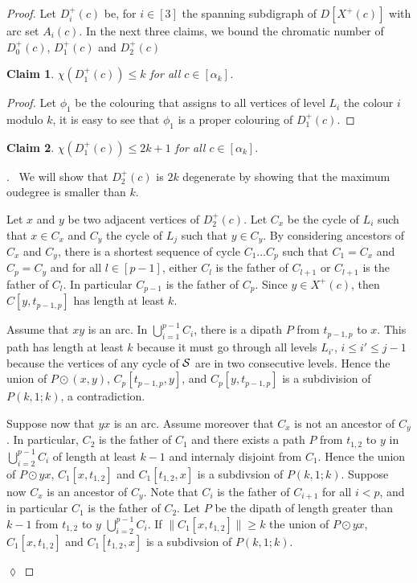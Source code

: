 \documentclass[utf8,10pt]{article}
\theoremstyle{plain}
\newtheorem{claim}{Claim}[theorem]
\theoremstyle{definition}
\theoremstyle{remark}
\newenvironment{subproof}{\par\noindent {\it Subproof}.\ }{\hfill$\lozenge$\par\vspace{11pt}}
\begin{document}
\begin{proof}
Let $D^+_i(c)$ be, for $i \in [3]$ the spanning subdigraph of $D[X^+(c)]$ with arc set $A_i(c)$.
In the next three claims, we bound the chromatic number of $D^+_0(c)$, $D^+_1(c)$ and  $D^+_2(c)$

\begin{claim}\label{claim:D1}
$\chi(D^+_1(c))\leq k$ for all $c\in [\alpha_k]$.
\end{claim}

\begin{proof}
Let $\phi_1$ be the colouring that assigns to all vertices of level $L_i$ the colour $i$ modulo $k$, it 
is easy to see that $\phi_1$ is a proper colouring of $D^+_1(c)$.
\end{proof}

\begin{claim}\label{claim:D2}
$\chi(D^+_1(c))\leq 2k +1 $ for all $c\in [\alpha_k]$.
\end{claim}

\begin{subproof}
We will show that $D^+_2(c)$ is $2k$ degenerate by showing that the maximum oudegree is smaller than $k$.  

Let $x$ and $y$ be two adjacent vertices of $D^+_2(c)$.
Let $C_x$ be the cycle of $L_i$ such that $x \in C_x$ and $C_y$ the cycle of $L_j$ such that $y \in C_y$.
By considering ancestors of $C_x$ and $C_y$, there is a shortest sequence of cycle $C_1 \dots C_p$ such that $C_1 = C_x$ and $C_p = C_y$ and for all $l\in [p-1]$, either $C_l$ is the father of $C_{l+1}$ or $C_{l+1}$ is the father of $C_l$.
In particular $C_{p-1}$ is the father of $C_p$. Since $y\in X^+(c)$, then $C[y,t_{p-1,p}]$ has length at least $k$.

Assume that $xy$ is an arc. In $\bigcup_{i=1}^{p-1} C_i$, there is a dipath $P$ from $t_{p-1,p}$ to $x$. This path has length at least $k$ because
it must go through all levels $L_{i'}$, $i\leq i'\leq j-1$ because the vertices of any cycle of ${\cal S}$ are in two consecutive levels.
Hence the union of $P\odot (x,y)$, $C_p[t_{p-1,p}, y]$, and  $C_p[y,t_{p-1,p}]$ is a subdivision of $P(k,1;k)$, a contradiction.

Suppose now that $yx$ is an arc. Assume moreover that $C_x$ is not an ancestor of $C_y$. In particular, $C_2$ is the father of $C_1$
and there exists a path $P$ from $t_{1,2}$ to $y$ in $\bigcup_{i=2}^{p-1} C_i$ of length at least $k-1$ and 
internaly disjoint from $C_1$. Hence the union of $P \odot yx$, $C_1[x,t_{1,2}]$ and $C_1[t_{1,2},x]$ is a subdivsion of  $P(k,1;k)$.
Suppose now $C_x$ is an ancestor of $C_y$. Note that $C_i$ is the father of $C_{i+1}$ for all $i < p$, and 
in particular $C_1$ is the father of $C_2$. Let $P$ be the dipath of length greater than $k-1$ from $t_{1,2}$ 
to $y$ $\bigcup_{i=2}^{p-1} C_i$. If $ \| C_1[x,t_{1,2}] \| \geq k$ 
the union of $P \odot yx$, $C_1[x,t_{1,2}]$ and $C_1[t_{1,2},x]$ is a subdivsion of  $P(k,1;k)$.


\end{subproof}
\end{proof}
\end{document}
